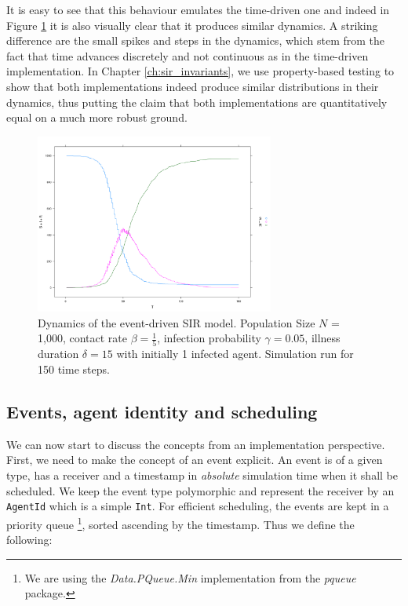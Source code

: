 \medskip

It is easy to see that this behaviour emulates the time-driven one and indeed in Figure \ref{fig:sir_eventdriven_dynamics} it is also visually clear that it produces similar dynamics. A striking difference are the small spikes and steps in the dynamics, which stem from the fact that time advances discretely and not continuous as in the time-driven implementation. In Chapter \ref{ch:sir_invariants}, we use property-based testing to show that both implementations indeed produce similar distributions in their dynamics, thus putting the claim that both implementations are quantitatively equal on a much more robust ground.

\begin{figure}
	\centering
	\includegraphics[width=0.7\textwidth, angle=0]{./fig/eventdriven/sir_eventdriven.png}
	\caption{Dynamics of the event-driven SIR model. Population Size $N$ = 1,000, contact rate $\beta = \frac{1}{5}$, infection probability $\gamma = 0.05$, illness duration $\delta = 15$ with initially 1 infected agent. Simulation run for 150 time steps.}
	\label{fig:sir_eventdriven_dynamics}
\end{figure}

\subsection{Events, agent identity and scheduling}
We can now start to discuss the concepts from an implementation perspective. First, we need to make the concept of an event explicit. An event is of a given type, has a receiver and a timestamp in \textit{absolute} simulation time when it shall be scheduled. We keep the event type polymorphic and represent the receiver by an \texttt{AgentId} which is a simple \texttt{Int}. For efficient scheduling, the events are kept in a priority queue \footnote{We are using the \textit{Data.PQueue.Min} implementation from the \textit{pqueue} package.}, sorted ascending by the timestamp. Thus we define the following:

